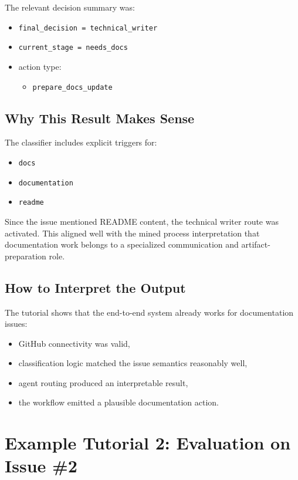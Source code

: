 \documentclass[11pt,a4paper]{article}
\begin{document}
The relevant decision summary was:
\begin{itemize}
    \item \texttt{final\_decision = technical\_writer}
    \item \texttt{current\_stage = needs\_docs}
    \item action type:
    \begin{itemize}
        \item \texttt{prepare\_docs\_update}
    \end{itemize}
\end{itemize}

\subsection{Why This Result Makes Sense}

The classifier includes explicit triggers for:
\begin{itemize}
    \item \texttt{docs}
    \item \texttt{documentation}
    \item \texttt{readme}
\end{itemize}

Since the issue mentioned README content, the technical writer route was activated. This aligned well with the mined process interpretation that documentation work belongs to a specialized communication and artifact-preparation role.

\subsection{How to Interpret the Output}

The tutorial shows that the end-to-end system already works for documentation issues:
\begin{itemize}
    \item GitHub connectivity was valid,
    \item classification logic matched the issue semantics reasonably well,
    \item agent routing produced an interpretable result,
    \item the workflow emitted a plausible documentation action.
\end{itemize}

\section{Example Tutorial 2: Evaluation on Issue \#2}
\end{document}
